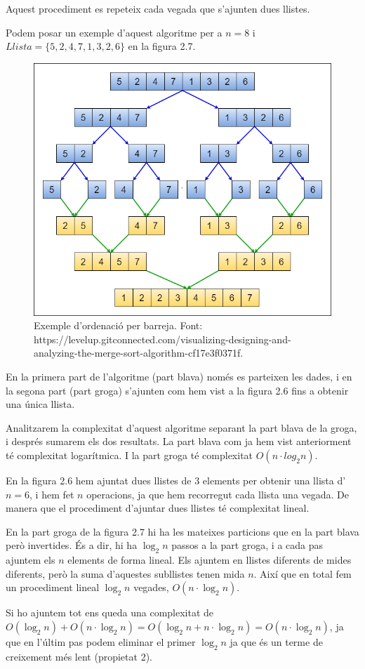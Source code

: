 Aquest procediment es repeteix cada vegada que s'ajunten dues llistes.

Podem posar un exemple d'aquest algoritme per a $n = 8$ i $Llista = \lbrace5, 2, 4, 7, 1, 3, 2, 6\rbrace$ en la figura 2.7.
\vspace{18pt}
\begin{figure}[H]
    \centering
    \includegraphics[width=.55\textwidth]{capitols/figures/merge5.png}
    \vspace{10pt}
    \caption[Exemple d'ordenació per barreja.]{Exemple d'ordenació per barreja. Font: https://levelup.gitconnected.com/visualizing-designing-and-analyzing-the-merge-sort-algorithm-cf17e3f0371f.}
    \label{fig:my_label}
\end{figure}

\vspace{-18pt}
En la primera part de l'algoritme (part blava) només es parteixen les dades, i en la segona part (part groga) s'ajunten com hem vist a la figura 2.6 fins a obtenir una única llista.

Analitzarem la complexitat d'aquest algoritme separant la part blava de la groga, i després sumarem els dos resultats. La part blava com ja hem vist anteriorment té complexitat logarítmica. I la part groga té complexitat $O(n \cdot log_2{n})$.

En la figura 2.6 hem ajuntat dues llistes de 3 elements per obtenir una llista d'$n = 6$, i hem fet $n$ operacions, ja que hem recorregut cada llista una vegada. De manera que el procediment d'ajuntar dues llistes té complexitat lineal.

En la part groga de la figura 2.7 hi ha les mateixes particions que en la part blava però invertides. És a dir, hi ha $\log_2{n}$ passos a la part groga, i a cada pas ajuntem els $n$ elements de forma lineal. Els ajuntem en llistes diferents de mides diferents, però la suma d'aquestes subllistes tenen mida $n$. Així que en total fem un procediment lineal $\log_2{n}$ vegades, $O(n \cdot \log_2{n})$.

Si ho ajuntem tot ens queda una complexitat de $O(\log_2{n}) + O(n \cdot \log_2{n} ) = O(\log_2{n} + n \cdot \log_2{n}) = O(n \cdot \log_2{n})$, ja que en l'últim pas podem eliminar el primer $\log_2{n}$ ja que és un terme de creixement més lent (propietat 2).
